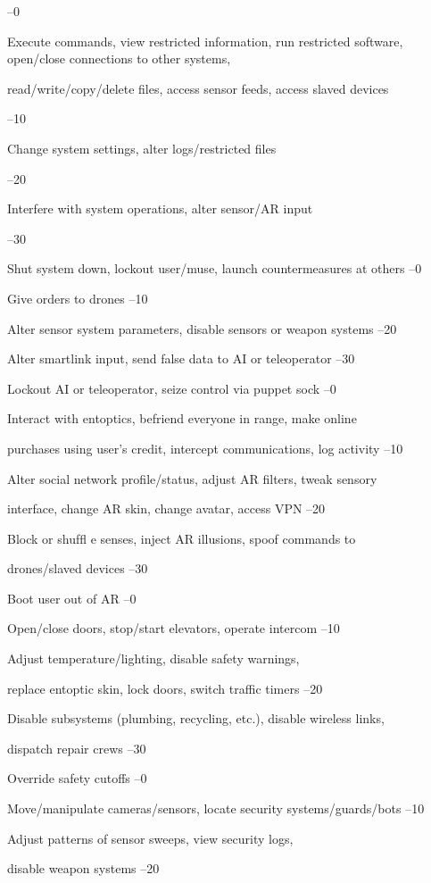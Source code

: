 –0

Execute commands, view restricted information, run restricted software, open/close connections to other systems, 

read/write/copy/delete files, access sensor feeds, access slaved devices

–10

Change system settings, alter logs/restricted files

–20

Interfere with system operations, alter sensor/AR input

–30

Shut system down, lockout user/muse, launch countermeasures at others
–0

Give orders to drones
–10

Alter sensor system parameters, disable sensors or weapon systems
–20

Alter smartlink input, send false data to AI or teleoperator
–30

Lockout AI or teleoperator, seize control via puppet sock
–0

Interact with entoptics, befriend everyone in range, make online 

purchases using user's credit, intercept communications, log activity
–10

Alter social network profile/status, adjust AR filters, tweak sensory 

interface, change AR skin, change avatar, access VPN
–20

Block or shufﬂ e senses, inject AR illusions, spoof commands to 

drones/slaved devices
–30

Boot user out of AR
–0

 Open/close doors, stop/start elevators, operate intercom
–10

Adjust temperature/lighting, disable safety warnings, 

replace entoptic skin, lock doors, switch traffic timers
–20

Disable subsystems (plumbing, recycling, etc.), disable wireless links, 

dispatch repair crews
–30

Override safety cutoffs
–0

Move/manipulate cameras/sensors, locate security systems/guards/bots
–10

Adjust patterns of sensor sweeps, view security logs, 

disable weapon systems
–20

